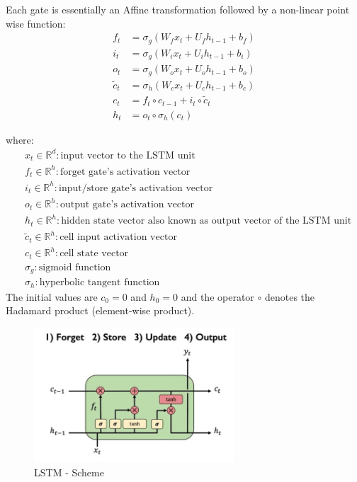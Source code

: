 \documentclass[12pt]{report}
\begin{document}
Each gate is essentially an Affine transformation followed by a non-linear point wise function:
\begin{align*}
	f_t &= \sigma_g(W_{f} x_t + U_{f} h_{t-1} + b_f) \\
	i_t &= \sigma_g(W_{i} x_t + U_{i} h_{t-1} + b_i) \\
	o_t &= \sigma_g(W_{o} x_t + U_{o} h_{t-1} + b_o) \\
	\tilde{c}_t &= \sigma_h(W_{c} x_t + U_{c} h_{t-1} + b_c) \\
	c_t &= f_t \circ c_{t-1} + i_t \circ \tilde{c}_t \\
	h_t &= o_t \circ \sigma_h(c_t)
\end{align*}

where: 
\begin{align*}
	&x_t \in \mathbb{R}^{d}: \text{input vector to the LSTM unit}\\
	&f_t \in \mathbb{R}^{h}: \text{forget gate's activation vector}\\
	&i_t \in \mathbb{R}^{h}: \text{input/store gate's activation vector}\\
	&o_t \in \mathbb{R}^{h}: \text{output gate's activation vector}\\
	&h_t \in \mathbb{R}^{h}: \text{hidden state vector also known as output vector of the LSTM unit}\\
	&\tilde{c}_t \in \mathbb{R}^{h} : \text{cell input activation vector}\\
	&c_t \in \mathbb{R}^{h} : \text{cell state vector}\\
	& \sigma_g: \text{sigmoid function} \\
	& \sigma_h:  \text{hyperbolic tangent function}
\end{align*}
The initial values are $c_0 = 0$ and $h_0 = 0$ and the operator $\circ$ denotes the Hadamard product (element-wise product). 


\begin{figure}[H]\centering\includegraphics[width=7.5cm]{LSTM_MAIN.jpeg}\caption{LSTM - Scheme}\end{figure}
\end{document}
